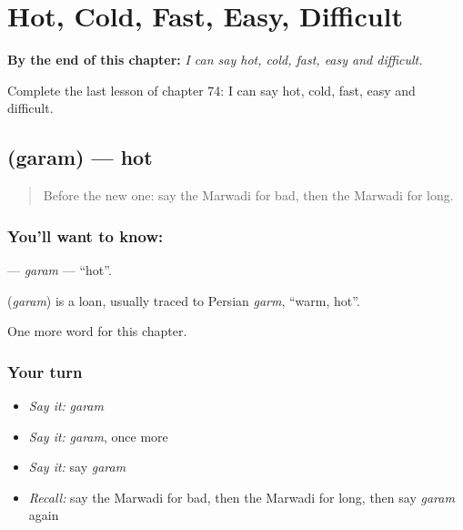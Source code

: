 
\chapter{Hot, Cold, Fast, Easy, Difficult}
\label{ch:mw-hot-cold-fast-easy-difficult}

\begin{chapteropening}
\textbf{By the end of this chapter:} \emph{I can say hot, cold, fast, easy and difficult.}

Complete the last lesson of chapter 74: I can say hot, cold, fast, easy and difficult.
\end{chapteropening}

\section[\texorpdfstring{\mw{गरम} (garam)}{गरम (garam)}]{ (garam) — hot}

\label{lesson:MW-C74-garam}



\begin{quote}
Before the new one: say the Marwadi for bad, then the Marwadi for long.
\end{quote}

\subsection*{You'll want to know: }
\textbf{} — \emph{garam} — \textquotedblleft{}hot\textquotedblright{}.

\begin{cousinweb}
\textbf{} (\emph{garam}) is a loan, usually traced to Persian \emph{garm}, \textquotedblleft{}warm, hot\textquotedblright{}.
\end{cousinweb}

\begin{grammarlens}[title={What you've built}]
One more word for this chapter.
\end{grammarlens}

\subsection*{Your turn}
\begin{itemize}
\raggedright
  \item \emph{Say it:} \emph{garam}
  \item \emph{Say it:} \emph{garam}, once more
  \item \emph{Say it:} say \emph{garam}
  \item \emph{Recall:} say the Marwadi for bad, then the Marwadi for long, then say \emph{garam} again
\end{itemize}

